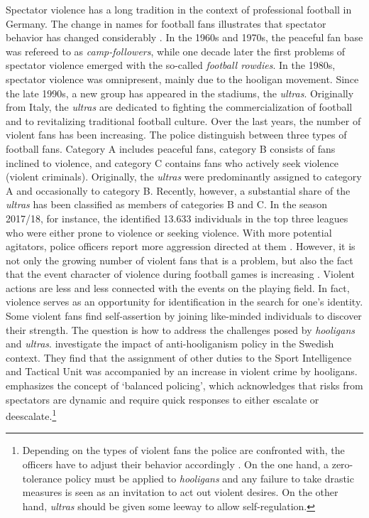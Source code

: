 Spectator violence has a long tradition in the context of professional football in Germany. The change in names for football fans illustrates that spectator behavior has changed considerably \citep{pilz2005kuttenfan}. In the 1960s and 1970s, the peaceful fan base was refereed to as \textit{camp-followers}, while one decade later the first problems of spectator violence emerged with the so-called \textit{football rowdies}. In the 1980s, spectator violence was omnipresent, mainly due to the hooligan movement. Since the late 1990s, a new group has appeared in the stadiums, the \textit{ultras}. Originally from Italy, the \textit{ultras} are dedicated to fighting the commercialization of football and to revitalizing traditional football culture. Over the last years, the number of violent fans has been increasing. The police distinguish between three types of football fans. Category A includes peaceful fans, category B consists of fans inclined to violence, and category C contains fans who actively seek violence (violent criminals). Originally, the \textit{ultras} were predominantly assigned to category A and occasionally to category B. Recently, however, a substantial share of the \textit{ultras} has been classified as members of categories B and C. In the season 2017/18, for instance, the \cite{zis17_18} identified 13.633 individuals in the top three leagues who were either prone to violence or seeking violence. With more potential agitators, police officers report more aggression directed at them \citep{feltes2010fussballgewalt}. However, it is not only the growing number of violent fans that is a problem, but also the fact that the event character of violence during football games is increasing \citep{pilz2005kuttenfan}. Violent actions are less and less connected with the events on the playing field. In fact, violence serves as an opportunity for identification in the search for one's identity. Some violent fans find self-assertion by joining like-minded individuals to discover their strength. The question is how to address the challenges posed by \textit{hooligans} and \textit{ultras}. \cite{poutvaara2009police} investigate the impact of anti-hooliganism policy in the Swedish context. They find that the assignment of other duties to the Sport Intelligence and Tactical Unit was accompanied by an increase in violent crime by hooligans. \cite{feltes2010fussballgewalt} emphasizes the concept of `balanced policing', which acknowledges that risks from spectators are dynamic and require quick responses to either escalate or deescalate.\footnote{Depending on the types of violent fans the police are confronted with, the officers have to adjust their behavior accordingly \citep{feltes2010fussballgewalt}. On the one hand, a zero-tolerance policy must be applied to \textit{hooligans} and any failure to take drastic measures is seen as an invitation to act out violent desires. On the other hand, \textit{ultras} should be given some leeway to allow self-regulation.} 



